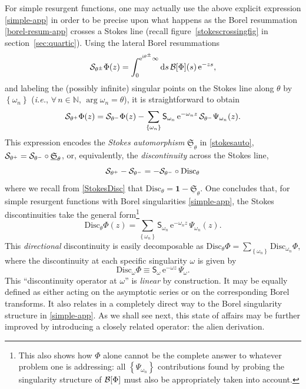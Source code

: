 \documentclass[11pt,a4paper]{article}
\newcommand{\CB}{{\cal B}}
\newcommand{\CS}{{\cal S}}
\def\BN{{\mathbb N}}
\newcommand{\be}{\begin{equation}}
\newcommand{\ee}{\end{equation}}
\def\1{\mathbf{1}}
\def\disc{{\mathrm{Disc}}}
\newcommand{\rme}{{\mathrm{e}}}
\newcommand{\rmi}{{\mathrm{i}}}
\newcommand{\rmd}{{\mathrm{d}}}
\begin{document}
For simple resurgent functions, one may actually use the above explicit expression \eqref{simple-app} in order to be precise upon what happens as the Borel resummation \eqref{borel-resum-app} crosses a Stokes line (recall figure~\ref{stokescrossingfig} in section~\ref{sec:quartic}). Using the lateral Borel resummations
%
\be
\CS_{\theta^\pm} \Phi (z) = \int_0^{\rme^{\rmi\theta^\pm}\infty} \rmd s\, \CB[\Phi](s)\, \rme^{-z s},
\ee
%
\noindent
and labeling the (possibly infinite) singular points on the Stokes line along $\theta$ by $\left\{ \omega_n \right\}$ (\textit{i.e.}, $\forall\, n \in \BN,\, \arg \omega_n = \theta$), it is straightforward to obtain
%
\be
\CS_{\theta^+} \Phi (z) = \CS_{\theta^-} \Phi (z) - \sum_{\left\{ \omega_n \right\}} \mathsf{S}_{\omega_n}\, \rme^{-\omega_n z}\, \CS_{\theta^-} \Psi_{\omega_n} (z).
\ee
%
\noindent
This expression encodes the \textit{Stokes automorphism} $\underline{\mathfrak{S}}_\theta$ in \eqref{stokesauto}, $\CS_{\theta^+} = \CS_{\theta^-} \circ \underline{\mathfrak{S}}_\theta$, or, equivalently, the \textit{discontinuity} across the Stokes line,
%
\be
\CS_{\theta^+} - \CS_{\theta^-} = - \CS_{\theta^-} \circ \disc_\theta
\ee
%
\noindent
where we recall from \eqref{StokesDisc} that $\disc_\theta = \1 - \underline{\mathfrak{S}}_\theta$. One concludes that, for simple resurgent functions with Borel singularities \eqref{simple-app}, the Stokes discontinuities take the general form\footnote{This also shows how $\Phi$ alone cannot be the complete answer to whatever problem one is addressing: all $\left\{ \Psi_{\omega_n} \right\}$ contributions found by probing the singularity structure of $\CB[\Phi]$ must also be appropriately taken into account.}
%
\be
\label{sum-disc-app}
\disc_\theta \Phi (z) = \sum_{\left\{ \omega_n \right\}} \mathsf{S}_{\omega_n}\, \rme^{-\omega_n z}\, \Psi_{\omega_n} (z).
\ee
%
\noindent
This \textit{directional} discontinuity is easily decomposable as $\disc_\theta \Phi = \sum_{\left\{ \omega_n \right\}} \disc_{\omega_n} \Phi$, where the discontinuity at each specific singularity $\omega$ is given by
%
\be
\label{disc-alone-app}
\disc_\omega \Phi \equiv \mathsf{S}_{\omega}\, \rme^{-\omega z}\, \Psi_{\omega}.
\ee
%
\noindent
This ``discontinuity operator at $\omega$'' is \textit{linear} by construction. It may be equally defined as either acting on the asymptotic series or on the corresponding Borel transforms. It also relates in a completely direct way to the Borel singularity structure in \eqref{simple-app}. As we shall see next, this state of affairs may be further improved by introducing a closely related operator: the alien derivation.
\end{document}
